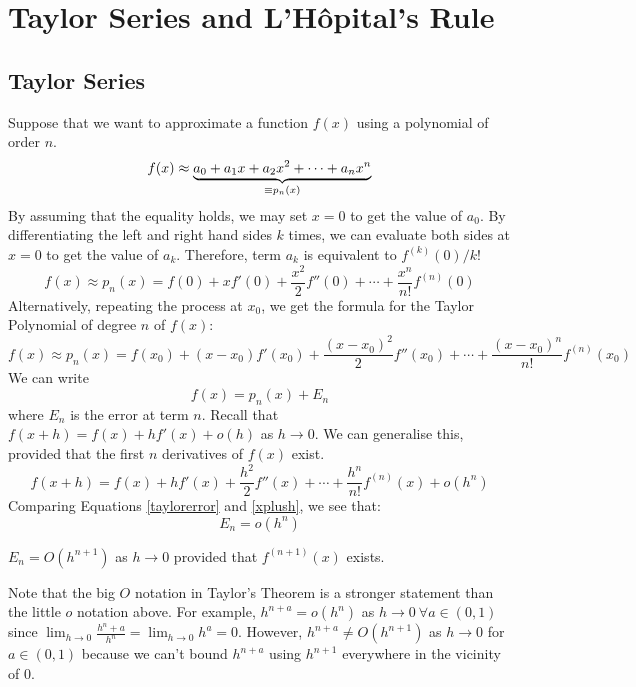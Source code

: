 \documentclass{article}
\begin{document}
\section{Taylor Series and L'H\^opital's Rule}
\subsection{Taylor Series}
Suppose that we want to approximate a function $f(x)$ using a polynomial of order $n$.
\[ f(x) \approx \underbrace{a_0 + a_1x + a_2x^2 + \cdots + a_nx^n}_{\mathclap{\equiv p_n(x)}} \]
By assuming that the equality holds, we may set $x=0$ to get the value of $a_0$. By differentiating the left and right hand sides $k$ times, we can evaluate both sides at $x=0$ to get the value of $a_k$. Therefore, term $a_k$ is equivalent to $f^{(k)}(0)/k!$
\[ f(x) \approx p_n(x) = f(0) + xf'(0) + \frac{x^2}{2}f''(0) + \cdots + \frac{x^n}{n!}f^{(n)}(0) \]
Alternatively, repeating the process at $x_0$, we get the formula for the Taylor Polynomial of degree $n$ of $f(x)$:
\[ f(x) \approx p_n(x) = f(x_0) + (x-x_0)f'(x_0) + \frac{(x-x_0)^2}{2}f''(x_0) + \cdots + \frac{(x-x_0)^n}{n!}f^{(n)}(x_0) \]
We can write
\begin{equation}\label{taylorerror}
    f(x) = p_n(x) + E_n
\end{equation}
where $E_n$ is the error at term $n$. Recall that $f(x+h) = f(x) + hf'(x) + o(h)$ as $h \to 0$. We can generalise this, provided that the first $n$ derivatives of $f(x)$ exist.
\begin{equation}\label{xplush}
    f(x+h) = f(x) + hf'(x) + \frac{h^2}{2}f''(x) + \cdots + \frac{h^n}{n!}f^{(n)}(x) + o(h^n)
\end{equation}
Comparing Equations \eqref{taylorerror} and \eqref{xplush}, we see that:
\[ E_n = o(h^n) \]
\begin{theorem}
    $E_n = O(h^{n+1})$ as $h \to 0$ provided that $f^{(n+1)}(x)$ exists.
\end{theorem}
Note that the big $O$ notation in Taylor's Theorem is a stronger statement than the little $o$ notation above. For example, $h^{n+a}=o(h^n)$ as $h \to 0\ \forall a \in (0, 1)$ since $\lim_{h\to 0} \frac{h^n+a}{h^n} = \lim_{h\to 0} h^a = 0$. However, $h^{n+a} \neq O(h^{n+1})$ as $h \to 0$ for $a \in (0, 1)$ because we can't bound $h^{n+a}$ using $h^{n+1}$ everywhere in the vicinity of $0$.
\end{document}
